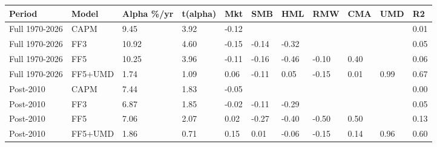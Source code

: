 \begin{tabular}{lllllllllll}
\toprule
Period & Model & Alpha \%/yr & t(alpha) & Mkt & SMB & HML & RMW & CMA & UMD & R2 \\
\midrule
Full 1970-2026 & CAPM & 9.45 & 3.92 & -0.12 &  &  &  &  &  & 0.01 \\
Full 1970-2026 & FF3 & 10.92 & 4.60 & -0.15 & -0.14 & -0.32 &  &  &  & 0.05 \\
Full 1970-2026 & FF5 & 10.25 & 3.96 & -0.11 & -0.16 & -0.46 & -0.10 & 0.40 &  & 0.06 \\
Full 1970-2026 & FF5+UMD & 1.74 & 1.09 & 0.06 & -0.11 & 0.05 & -0.15 & 0.01 & 0.99 & 0.67 \\
Post-2010 & CAPM & 7.44 & 1.83 & -0.05 &  &  &  &  &  & 0.00 \\
Post-2010 & FF3 & 6.87 & 1.85 & -0.02 & -0.11 & -0.29 &  &  &  & 0.05 \\
Post-2010 & FF5 & 7.06 & 2.07 & 0.02 & -0.27 & -0.40 & -0.50 & 0.50 &  & 0.13 \\
Post-2010 & FF5+UMD & 1.86 & 0.71 & 0.15 & 0.01 & -0.06 & -0.15 & 0.14 & 0.96 & 0.60 \\
\bottomrule
\end{tabular}
